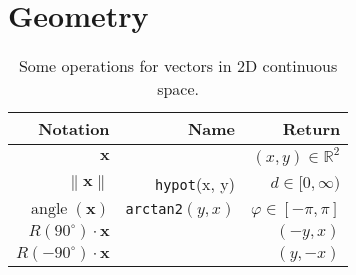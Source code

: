 \section{Geometry}
\begin{table}[H]
\begin{tabularx}{1.0\linewidth}{ R R R }
Notation & Name & Return \\
\hline
\hline
$ \mathbf{x} $ & & $ (x, y) \in \mathbb{R}^{2} $ \\
$ \left\| \mathbf{x} \right\| $      & \texttt{hypot}(x, y) & $ d \in [0, \infty) $ \\
$ \operatorname{angle}(\mathbf{x}) $ & \texttt{arctan2}$ (y, x) $ & $ \varphi \in [-\pi, \pi] $ \\
$ R(90^{\circ}) \cdot \mathbf{x} $   &  & $ (-y, x) $ \\
$ R(-90^{\circ}) \cdot \mathbf{x} $  &  & $ (y, -x) $ \\
\end{tabularx}
\caption{Some operations for vectors in 2D continuous space.}
\end{table}